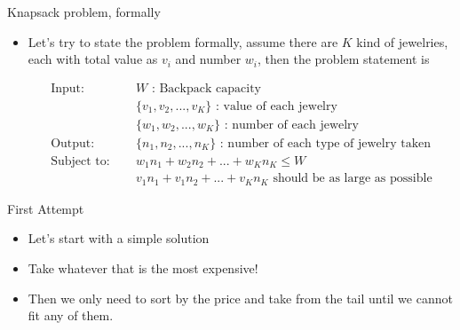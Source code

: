 \documentclass[10pt,xcolor={table,dvipsnames},t]{beamer}
\begin{document}
\begin{frame}[fragile]{Knapsack problem, formally}
  \begin{itemize}
    \item Let's try to state the problem formally, assume there are $K$ kind of jewelries, each with total value as $v_{i}$ and number $w_{i}$, then the problem statement is
    \begin{center}
      \begin{eqnarray*}
        \text{Input:}&\enspace&W\text{ : Backpack capacity}\\
        &\enspace&\{v_{1},v_{2},...,v_{K}\}\text{ : value of each jewelry}\\
        &\enspace&\{w_{1},w_{2},...,w_{K}\}\text{ : number of each jewelry}\\
        \text{Output:}&\enspace&\{n_{1},n_{2},...,n_{K}\}\text{ : number of each type of jewelry taken}\\
        \text{Subject to:}&\enspace&w_{1}n_{1}+w_{2}n_{2}+...+w_{K}n_{K}\leq W\\
        &\enspace&v_{1}n_{1}+v_{1}n_{2}+...+v_{K}n_{K}\text{ should be as large as possible}
      \end{eqnarray*}
    \end{center}
  \end{itemize}
\end{frame}

\begin{frame}[fragile]{First Attempt}
  \begin{itemize}
    \item Let's start with a simple solution
    \item Take whatever that is the most expensive!
    \item Then we only need to sort by the price and take from the tail until we cannot fit any of them.
  \end{itemize}
\end{frame}
\end{document}
